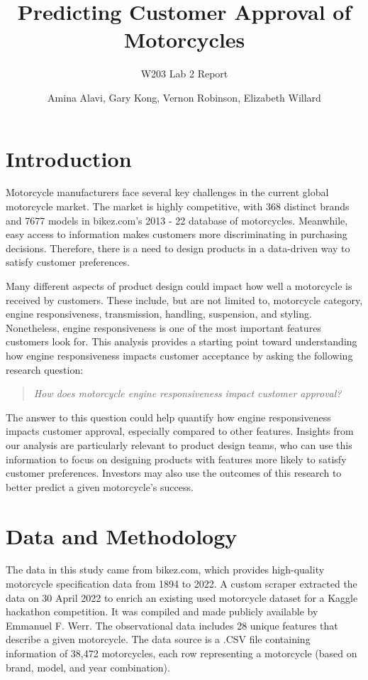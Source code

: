 \documentclass[
]{article}
\title{Predicting Customer Approval of Motorcycles}
\subtitle{W203 Lab 2 Report}
\author{Amina Alavi, Gary Kong, Vernon Robinson, Elizabeth Willard}
\date{}
\begin{document}
\maketitle

{
\setcounter{tocdepth}{2}
\tableofcontents
}
\newpage
\setcounter{page}{1}

\hypertarget{introduction}{%
\section{Introduction}\label{introduction}}

Motorcycle manufacturers face several key challenges in the current
global motorcycle market. The market is highly competitive, with
368 distinct brands and 7677
models in bikez.com's 2013 - 22 database of motorcycles. Meanwhile, easy
access to information makes customers more discriminating in purchasing
decisions. Therefore, there is a need to design products in a
data-driven way to satisfy customer preferences.

Many different aspects of product design could impact how well a
motorcycle is received by customers. These include, but are not limited
to, motorcycle category, engine responsiveness, transmission, handling,
suspension, and styling. Nonetheless, engine responsiveness is one of
the most important features customers look for. This analysis provides a
starting point toward understanding how engine responsiveness impacts
customer acceptance by asking the following research question:

\begin{quote}
  \textit{How does motorcycle engine responsiveness impact customer approval?}
\end{quote}

The answer to this question could help quantify how engine
responsiveness impacts customer approval, especially compared to other
features. Insights from our analysis are particularly relevant to
product design teams, who can use this information to focus on designing
products with features more likely to satisfy customer preferences.
Investors may also use the outcomes of this research to better predict a
given motorcycle's success.

\hypertarget{data-and-methodology}{%
\section{Data and Methodology}\label{data-and-methodology}}

The data in this study came from bikez.com, which provides high-quality
motorcycle specification data from 1894 to 2022. A custom scraper
extracted the data on 30 April 2022 to enrich an existing used
motorcycle dataset for a Kaggle hackathon competition. It was compiled
and made publicly available by Emmanuel F. Werr. The observational data
includes 28 unique features that describe a given motorcycle. The data
source is a .CSV file containing information of 38,472 motorcycles, each
row representing a motorcycle (based on brand, model, and year
combination).
\end{document}
